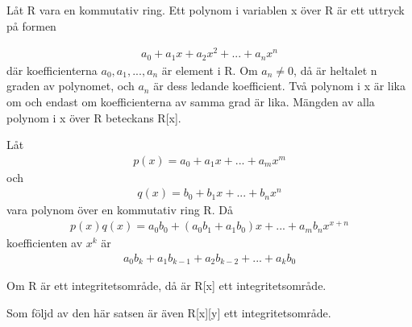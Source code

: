\begin{definition}
Låt R vara en kommutativ ring. Ett polynom i variablen x över R är ett uttryck på formen 

\begin{align*}
 a_0+a_1x+a_2x^2+...+a_nx^n
\end{align*}
där koefficienterna $a_0, a_1,...,a_n$ är element i R. Om $a_n \neq 0$, då är heltalet n graden av polynomet, och $a_n$ är dess ledande koefficient. Två polynom i x är lika om och endast om 
koefficienterna av samma grad är lika. Mängden av alla polynom i x över R beteckans R[x]. 

\end{definition}

\begin{definition}
 Låt
\begin{align*}
 p(x)=a_0+a_1x+...+a_mx^m
\end{align*}
och
\begin{align*}
 q(x)=b_0+b_1x+...+b_nx^n
\end{align*}
vara polynom över en kommutativ ring R. Då
\begin{align*}
 p(x)q(x)=a_0b_0+(a_0b_1+a_1b_0)x+...+a_mb_nx^{x+n}
\end{align*}
koefficienten av $x^k$ är
\begin{align*}
 a_0b_k+a_1b_{k-1}+a_2b_{k-2}+...+a_kb_0
\end{align*}

\end{definition}

\begin{theorem}
 Om R är ett integritetsområde, då är R[x] ett integritetsområde.
\end{theorem}

Som följd av den här satsen är även R[x][y] ett integritetsområde.
